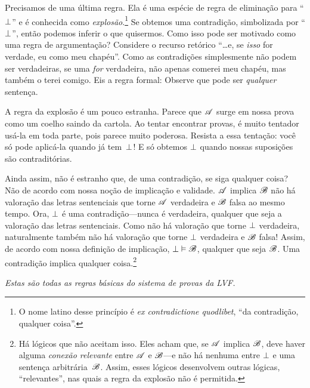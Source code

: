 Precisamos de uma última regra. Ela é uma espécie de regra de eliminação para \textquotedblleft$\bot$\textquotedblright{} e é conhecida como \emph{explosão}.\footnote{O nome latino desse princípio é \emph{ex contradictione quodlibet}, \textquotedblleft{}da contradição, qualquer coisa\textquotedblright{}.} Se obtemos uma contradição, simbolizada por \textquotedblleft$\bot$\textquotedblright{}, então podemos inferir o que quisermos. Como isso pode ser motivado como uma regra de argumentação? Considere o recurso retórico \textquotedblleft{}\ldots e, se \emph{isso} for verdade, eu como meu chapéu\textquotedblright{}. Como as contradições simplesmente não podem ser verdadeiras, se uma \emph{for} verdadeira, não apenas comerei meu chapéu, mas também o terei comigo. Eis a regra formal:
Observe que  pode ser \emph{qualquer} sentença.

A regra da explosão é um pouco estranha. Parece que $\mathscr{A}$ surge em nossa prova como um coelho saindo da cartola. Ao tentar encontrar provas, é muito tentador usá-la em toda parte, pois parece muito poderosa. Resista a essa tentação: você só pode aplicá-la quando já tem~$\bot$! E só obtemos $\bot$ quando nossas suposições são contraditórias.

Ainda assim, não é estranho que, de uma contradição, se siga qualquer coisa? Não de acordo com nossa noção de implicação e validade. $\mathscr{A}$ implica $\mathscr{B}$ \ifeff{} não há valoração das letras sentenciais que torne $\mathscr{A}$ verdadeira e $\mathscr{B}$ falsa ao mesmo tempo. Ora, $\bot$ é uma contradição---nunca é verdadeira, qualquer que seja a valoração das letras sentenciais. Como não há valoração que torne $\bot$ verdadeira, naturalmente também não há valoração que torne $\bot$ verdadeira e $\mathscr{B}$ falsa! Assim, de acordo com nossa definição de implicação, $\bot \vDash \mathscr{B}$, qualquer que seja $\mathscr{B}$. Uma contradição implica qualquer coisa.\footnote{Há lógicos que não aceitam isso. Eles acham que, se $\mathscr{A}$ implica $\mathscr{B}$, deve haver alguma \emph{conexão relevante} entre $\mathscr{A}$ e $\mathscr{B}$---e não há nenhuma entre $\bot$ e uma sentença arbitrária~$\mathscr{B}$. Assim, esses lógicos desenvolvem outras lógicas, \textquotedblleft{}relevantes\textquotedblright{}, nas quais a regra da explosão não é permitida.}

\emph{Estas são todas as regras básicas do sistema de provas da LVF.}

